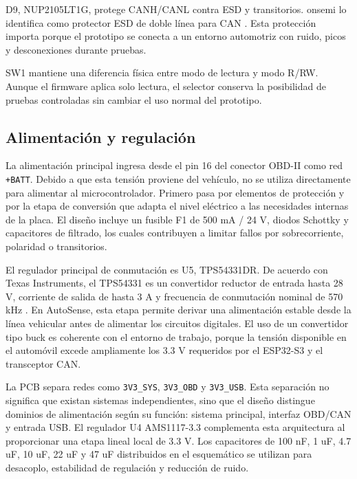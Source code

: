 \documentclass[12pt,letterpaper]{report}
\begin{document}
D9, NUP2105LT1G, protege CANH/CANL contra ESD y transitorios. onsemi lo identifica como protector ESD de doble línea para CAN \cite{onsemi2026_nup2105l}. Esta protección importa porque el prototipo se conecta a un entorno automotriz con ruido, picos y desconexiones durante pruebas.

SW1 mantiene una diferencia física entre modo de lectura y modo R/RW. Aunque el firmware aplica solo lectura, el selector conserva la posibilidad de pruebas controladas sin cambiar el uso normal del prototipo.

\subsection{Alimentación y regulación}

La alimentación principal ingresa desde el pin 16 del conector OBD-II como red \texttt{+BATT}. Debido a que esta tensión proviene del vehículo, no se utiliza directamente para alimentar al microcontrolador. Primero pasa por elementos de protección y por la etapa de conversión que adapta el nivel eléctrico a las necesidades internas de la placa. El diseño incluye un fusible F1 de 500 mA / 24 V, diodos Schottky y capacitores de filtrado, los cuales contribuyen a limitar fallos por sobrecorriente, polaridad o transitorios.

El regulador principal de conmutación es U5, TPS54331DR. De acuerdo con Texas Instruments, el TPS54331 es un convertidor reductor de entrada hasta 28 V, corriente de salida de hasta 3 A y frecuencia de conmutación nominal de 570 kHz \cite{ti2026_tps54331_product}. En AutoSense, esta etapa permite derivar una alimentación estable desde la línea vehicular antes de alimentar los circuitos digitales. El uso de un convertidor tipo buck es coherente con el entorno de trabajo, porque la tensión disponible en el automóvil excede ampliamente los 3.3 V requeridos por el ESP32-S3 y el transceptor CAN.

La PCB separa redes como \texttt{3V3\_SYS}, \texttt{3V3\_OBD} y \texttt{3V3\_USB}. Esta separación no significa que existan sistemas independientes, sino que el diseño distingue dominios de alimentación según su función: sistema principal, interfaz OBD/CAN y entrada USB. El regulador U4 AMS1117-3.3 complementa esta arquitectura al proporcionar una etapa lineal local de 3.3 V. Los capacitores de 100 nF, 1 uF, 4.7 uF, 10 uF, 22 uF y 47 uF distribuidos en el esquemático se utilizan para desacoplo, estabilidad de regulación y reducción de ruido.
\end{document}
